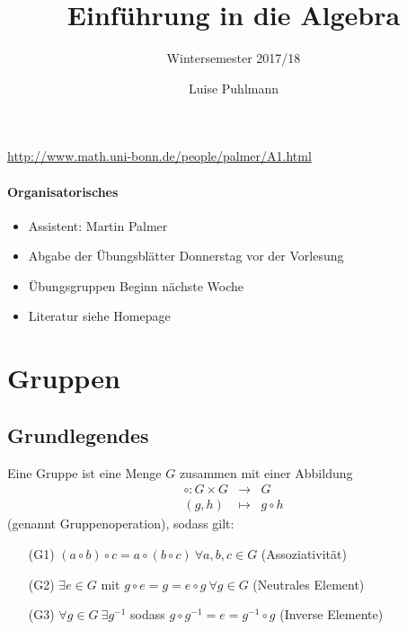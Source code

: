 \documentclass[12pt,a4paper]{scrartcl}
\author{Luise Puhlmann}
\title{Einführung in die Algebra}
\subtitle{Wintersemester 2017/18}
\begin{document}
\maketitle
\tableofcontents
\newpage


\url{http://www.math.uni-bonn.de/people/palmer/A1.html}

\paragraph {Organisatorisches}
\begin{itemize}
	\item Assistent: Martin Palmer
	\item Abgabe der Übungsblätter Donnerstag vor der Vorlesung
	\item Übungsgruppen Beginn nächste Woche
	\item Literatur siehe Homepage
\end{itemize}

\section{Gruppen}
\subsection{Grundlegendes}
\begin{defi} Eine Gruppe ist eine Menge $G$ zusammen mit einer Abbildung
\begin{eqnarray*}
	\circ\colon G\times G &\to& G\\
	 (g,h)&\mapsto& g\circ h
\end{eqnarray*}
(genannt Gruppenoperation), sodass gilt:
\begin{itemize}
	\item[(G1)]$(a\circ b)\circ c = a \circ (b\circ c) ~ \forall a,b,c\in G$ (Assoziativität)
	\item[(G2)] $\exists e\in G$ mit $g\circ e = g = e\circ g ~ \forall g\in G$ (Neutrales Element)
	\item[(G3)] $\forall g\in G\ \exists g^{-1}$ sodass $g\circ g^{-1} = e = g^{-1}\circ g$ (Inverse Elemente)
\end{itemize}
\end{defi}
\end{document}
